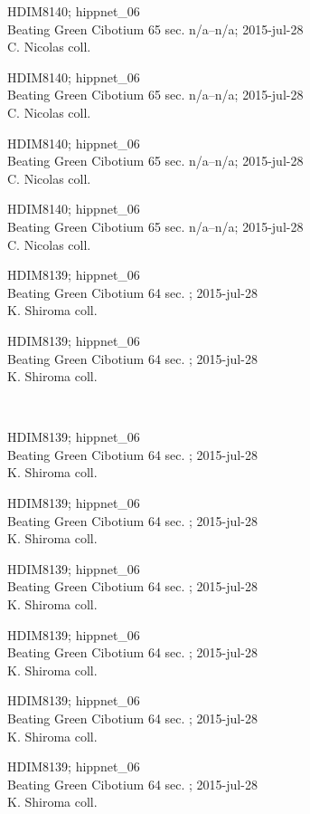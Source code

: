 \documentclass[2pt]{extarticle}
\begin{document}
\noindent
\parbox{0.16\textwidth}{\tiny \raggedright \rule[-0.3\baselineskip]{0pt}{10pt}HDIM8140; hippnet\_06\\ Beating Green Cibotium 65 sec. n/a--n/a; 2015-jul-28\\ C. Nicolas coll.}
\parbox{0.16\textwidth}{\tiny \raggedright \rule[-0.3\baselineskip]{0pt}{10pt}HDIM8140; hippnet\_06\\ Beating Green Cibotium 65 sec. n/a--n/a; 2015-jul-28\\ C. Nicolas coll.}
\parbox{0.16\textwidth}{\tiny \raggedright \rule[-0.3\baselineskip]{0pt}{10pt}HDIM8140; hippnet\_06\\ Beating Green Cibotium 65 sec. n/a--n/a; 2015-jul-28\\ C. Nicolas coll.}
\parbox{0.16\textwidth}{\tiny \raggedright \rule[-0.3\baselineskip]{0pt}{10pt}HDIM8140; hippnet\_06\\ Beating Green Cibotium 65 sec. n/a--n/a; 2015-jul-28\\ C. Nicolas coll.}
\parbox{0.16\textwidth}{\tiny \raggedright \rule[-0.3\baselineskip]{0pt}{10pt}HDIM8139; hippnet\_06\\ Beating Green Cibotium 64 sec. ; 2015-jul-28\\ K. Shiroma coll.}
\parbox{0.16\textwidth}{\tiny \raggedright \rule[-0.3\baselineskip]{0pt}{10pt}HDIM8139; hippnet\_06\\ Beating Green Cibotium 64 sec. ; 2015-jul-28\\ K. Shiroma coll.} \\ 
\vspace{0.001in} 

\noindent
\parbox{0.16\textwidth}{\tiny \raggedright \rule[-0.3\baselineskip]{0pt}{10pt}HDIM8139; hippnet\_06\\ Beating Green Cibotium 64 sec. ; 2015-jul-28\\ K. Shiroma coll.}
\parbox{0.16\textwidth}{\tiny \raggedright \rule[-0.3\baselineskip]{0pt}{10pt}HDIM8139; hippnet\_06\\ Beating Green Cibotium 64 sec. ; 2015-jul-28\\ K. Shiroma coll.}
\parbox{0.16\textwidth}{\tiny \raggedright \rule[-0.3\baselineskip]{0pt}{10pt}HDIM8139; hippnet\_06\\ Beating Green Cibotium 64 sec. ; 2015-jul-28\\ K. Shiroma coll.}
\parbox{0.16\textwidth}{\tiny \raggedright \rule[-0.3\baselineskip]{0pt}{10pt}HDIM8139; hippnet\_06\\ Beating Green Cibotium 64 sec. ; 2015-jul-28\\ K. Shiroma coll.}
\parbox{0.16\textwidth}{\tiny \raggedright \rule[-0.3\baselineskip]{0pt}{10pt}HDIM8139; hippnet\_06\\ Beating Green Cibotium 64 sec. ; 2015-jul-28\\ K. Shiroma coll.}
\parbox{0.16\textwidth}{\tiny \raggedright \rule[-0.3\baselineskip]{0pt}{10pt}HDIM8139; hippnet\_06\\ Beating Green Cibotium 64 sec. ; 2015-jul-28\\ K. Shiroma coll.} \\ 
\vspace{0.001in} 
\end{document}
